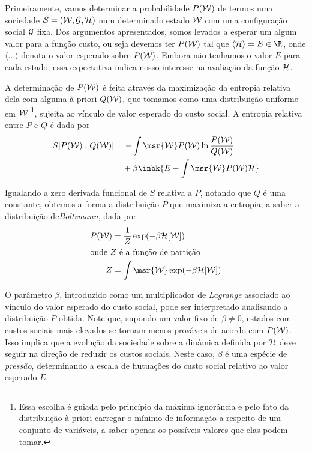 Primeiramente, vamos determinar a probabilidade $P(\mathcal{W})$ de termos
uma sociedade $\mathcal{S} = (\mathcal{W}, \mathcal{G}, {\mathcal{H}})$ num determinado estado $\mathcal{W}$
com uma configuração social $\mathcal{G}$ fixa. Dos argumentos apresentados,
somos levados a esperar um algum valor para a função custo, ou seja
devemos ter $P(\mathcal{W})$ tal que $\langle\cost\rangle=E \in \R$, onde
$\langle\dots\rangle$ denota o valor esperado sobre $P(\mathcal{W})$. Embora
não tenhamos o valor $E$ para cada estado, essa expectativa indica 
nosso interesse na avaliação da função ${\mathcal{H}}$. 

A determinação de $P(\mathcal{W})$ é feita através da maximização da entropia
relativa dela com alguma à priori $Q(\mathcal{W})$, que tomamos como uma
distribuição uniforme em $\mathcal{W}$ \footnote{Essa escolha é guiada pelo
  princípio da máxima ignorância e pelo fato da distribuição à priori
  carregar o mínimo de informação a respeito de um conjunto de
  variáveis, a saber apenas os possíveis valores que elas podem
  tomar.}, sujeita ao vínculo de valor esperado do custo social.
A entropia relativa entre $P$ e $Q$ é dada por
\begin{align}\label{eq:ent-Pw}
  S[P(\MM):Q(\MM)] & = -\int \msr{\MM} P(\MM) \ln \frac{P(\MM)}{Q(\MM)} \notag \\
                   & \quad + \beta \inbk{E - \int \msr{\MM} P(\MM)\cost}
\end{align}

Igualando a zero derivada funcional de $S$ relativa a $P$, notando que
$Q$ é uma constante, obtemos a forma a distribuição $P$ que maximiza a
entropia, a saber a distribuição de\emph{Boltzmann}, dada por
\begin{align}
  P(\MM) & = \frac{1}{Z} \exp (-\beta \cost [\MM]) \label{eq:Pw} \\
\intertext{onde $Z$ é a função de partição}
  Z & = \int \msr{\MM} \exp (-\beta \cost [\MM]) \label{eq:Zw}
\end{align}

O parâmetro $\beta$, introduzido como um multiplicador de
\emph{Lagrange} associado ao vínculo do valor esperado do custo
social, pode ser interpretado analisando a distribuição $P$
obtida. Note que, supondo um valor fixo de $\beta \neq 0$, estados com
custos sociais mais elevados se tornam menos prováveis de acordo com
$P(\mathcal{W})$. Isso implica que a evolução da sociedade sobre a dinâmica
definida por ${\mathcal{H}}$ deve seguir na direção de reduzir os custos
sociais. Neste caso, $\beta$ é uma espécie de \emph{pressão},
determinando a escala de flutuações do custo social relativo ao valor
esperado $E$.

